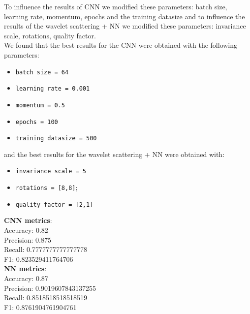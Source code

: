 \documentclass{report}
\begin{document}
To influence the results of CNN we modified these parameters: batch size, learning rate, momentum, epochs and the training datasize and to influence the results of the wavelet scattering + NN we modified these parameters: invariance scale, rotations, quality factor.\\
We found that the best results for the CNN were obtained with the following parameters:
\begin{itemize}
    \item \texttt{batch size = 64}
    \item \texttt{learning rate = 0.001}
    \item \texttt{momentum = 0.5}
    \item \texttt{epochs = 100}
    \item \texttt{training datasize = 500}
\end{itemize}
and the best results for the wavelet scattering + NN were obtained with:
\begin{itemize}
    \item \texttt{invariance scale = 5}
    \item \texttt{rotations =  [8,8]};
    \item \texttt{quality factor = [2,1]}
\end{itemize}
\textbf{CNN metrics}: \\
Accuracy:               0.82\\
Precision:              0.875\\
Recall:                 0.7777777777777778\\
F1:                     0.823529411764706\\
\textbf{NN metrics}:\\
Accuracy:               0.87\\
Precision:              0.9019607843137255\\
Recall:                 0.8518518518518519\\
F1:                     0.8761904761904761\\
\end{document}
